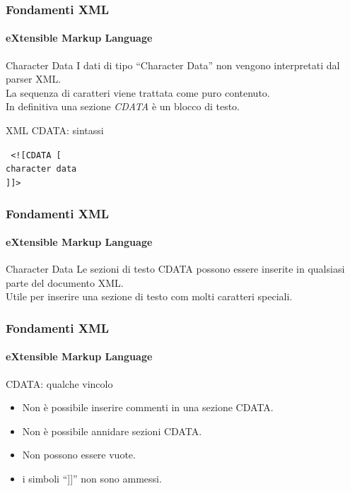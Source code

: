 \begin{frame}
    \frametitle{Fondamenti XML}
    \framesubtitle{eXtensible Markup Language}
    \addtocounter{nframe}{1}

	\begin{block}{Character Data}
		I dati di tipo ``Character Data'' non vengono interpretati dal parser XML.
		\\ La sequenza di caratteri viene trattata come puro contenuto.
		\\In definitiva una sezione \textit{CDATA} è un blocco di testo.
	\end{block}

	\begin{block}{XML CDATA: sintassi}
		\begin{center}
			\texttt{
				 <![CDATA [
					 \\character data
					 \\]]>
			}
		\end{center}
	\end{block}

\end{frame}



\begin{frame}
    \frametitle{Fondamenti XML}
    \framesubtitle{eXtensible Markup Language}
    \addtocounter{nframe}{1}

	\begin{block}{Character Data}
		Le sezioni di testo CDATA possono essere inserite in qualsiasi parte del documento XML.
		\\ Utile per inserire una sezione di testo com molti caratteri speciali.
	\end{block}

\end{frame}

\begin{frame}
    \frametitle{Fondamenti XML}
    \framesubtitle{eXtensible Markup Language}
    \addtocounter{nframe}{1}

	\begin{block}{CDATA: qualche vincolo}
		\begin{itemize}
			\item Non è possibile inserire commenti in una sezione CDATA.
			\item Non è possibile annidare sezioni CDATA. 
			\item Non possono essere vuote.
			\item i simboli ``]]'' non sono ammessi.
		\end{itemize}
	\end{block}

\end{frame}


